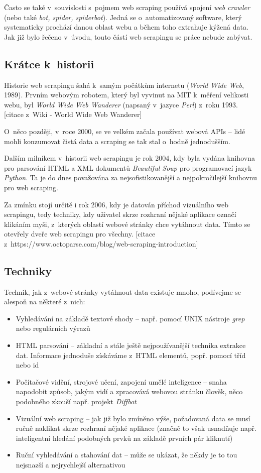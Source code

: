 \documentclass[thesis=B,czech]{FITthesis}[2012/06/26]
\begin{document}
Často se také v~souvislosti s~pojmem web scraping používá spojení \emph{web crawler} (nebo také \emph{bot, spider, spiderbot}). Jedná se o~automatizovaný software, který systematicky prochází danou oblast webu a během toho extrahuje kýžená data. Jak již bylo řečeno v~úvodu, touto částí web scrapingu se práce nebude zabývat.

\subsection{Krátce k~historii}
Historie web scrapingu šahá k~samým počátkům internetu (\emph{World Wide Web}, 1989). Prvním webovým robotem, který byl vyvinut na MIT k~měření velikosti webu, byl \emph{World Wide Web Wanderer} (napsaný v~jazyce \emph{Perl}) z~roku 1993. [citace z~Wiki - World Wide Web Wanderer] 

O~něco později, v~roce 2000, se ve velkém začala používat webová APIs -- lidé mohli konzumovat čistá data a scraping se tak stal o~hodně jednodušším. 

Dalším milníkem v~historii web scrapingu je rok 2004, kdy byla vydána knihovna pro parsování HTML a XML dokumentů \emph{Beautiful Soup} pro programovací jazyk \emph{Python}. Ta je do dnes považována za nejsofistikovanější a nejpokročilejší knihovnu pro web scraping.

Za zmínku stojí určitě i rok 2006, kdy je datován příchod vizuálního web scrapingu, tedy techniky, kdy uživatel skrze rozhraní nějaké aplikace označí klikáním myši, z~kterých oblastí webové stránky chce vytáhnout data. Tímto se otevřely dveře web scrapingu pro všechny. [citace z~https://www.octoparse.com/blog/web-scraping-introduction]

\subsection{Techniky}
Technik, jak z~webové stránky vytáhnout data existuje mnoho, podívejme se alespoň na některé z~nich:
\begin{itemize}
	\item Vyhledávání na základě textové shody -- např. pomocí UNIX nástroje \emph{grep} nebo regulárních výrazů
	\item HTML parsování -- základní a stále ještě nejpoužívanější technika extrakce dat. Informace jednoduše získáváme z~HTML elementů, popř. pomocí tříd nebo id
	\item Počítačové vidění, strojové učení, zapojení umělé inteligence -- snaha napodobit způsob, jakým vidí a zpracovává webovou stránku člověk, něco podobného zkouší např. projekt \emph{Diffbot}
	\item Vizuální web scraping -- jak již bylo zmíněno výše, požadovaná data se musí ručně naklikat skrze rozhraní nějaké aplikace (značně to však usnadňuje např. inteligentní hledání podobných prvků na základě prvních pár kliknutí)
	\item Ruční vyhledávání a stahování dat -- může se ukázat, že někdy je to tou nejsnazší a nejrychlejší alternativou
\end{itemize}
\end{document}
